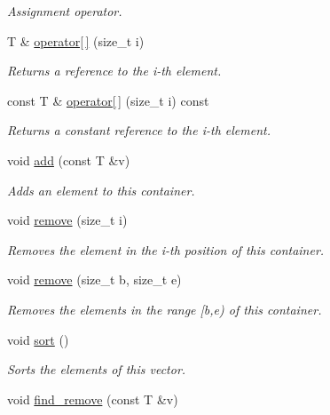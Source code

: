 \begin{DoxyCompactItemize}
\begin{DoxyCompactList}\small\item\em Assignment operator. \end{DoxyCompactList}\item 
T \& \hyperlink{classlgraph_1_1utils_1_1svector_a6943d4e89de5500202b9b01433b0f466}{operator\mbox{[}$\,$\mbox{]}} (size\-\_\-t i)
\begin{DoxyCompactList}\small\item\em Returns a reference to the i-\/th element. \end{DoxyCompactList}\item 
const T \& \hyperlink{classlgraph_1_1utils_1_1svector_a88de6e0d075bc9a0dc3b1fed31207a43}{operator\mbox{[}$\,$\mbox{]}} (size\-\_\-t i) const 
\begin{DoxyCompactList}\small\item\em Returns a constant reference to the i-\/th element. \end{DoxyCompactList}\item 
void \hyperlink{classlgraph_1_1utils_1_1svector_a14ffd05a33eeae26ddb0909d8f64ad28}{add} (const T \&v)
\begin{DoxyCompactList}\small\item\em Adds an element to this container. \end{DoxyCompactList}\item 
void \hyperlink{classlgraph_1_1utils_1_1svector_a9d377cbaa26f09a862334363e2d889cc}{remove} (size\-\_\-t i)
\begin{DoxyCompactList}\small\item\em Removes the element in the i-\/th position of this container. \end{DoxyCompactList}\item 
void \hyperlink{classlgraph_1_1utils_1_1svector_a1df0b9cabdb2e9f572f664d85ba42efb}{remove} (size\-\_\-t b, size\-\_\-t e)
\begin{DoxyCompactList}\small\item\em Removes the elements in the range \mbox{[}b,e) of this container. \end{DoxyCompactList}\item 
void \hyperlink{classlgraph_1_1utils_1_1svector_ac2199e164429f7469decfa9d8f033069}{sort} ()
\begin{DoxyCompactList}\small\item\em Sorts the elements of this vector. \end{DoxyCompactList}\item 
void \hyperlink{classlgraph_1_1utils_1_1svector_a2c67e3086677ea7f0c8526e3d12230aa}{find\-\_\-remove} (const T \&v)

\end{DoxyCompactItemize}
